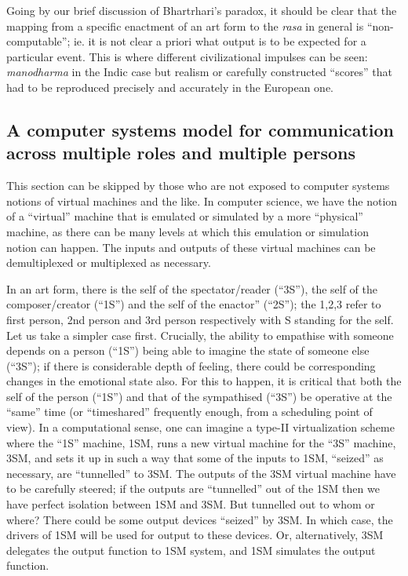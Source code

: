 Going by our brief discussion of Bhartrhari’s paradox, it should be clear that the mapping from a specific enactment of an art form to the \textsl{rasa} in general is “non-computable”; ie. it is not clear a priori what output is to be expected for a particular event. This is where different civilizational impulses can be seen: \textsl{manodharma} in the Indic case but realism or carefully constructed “scores” that had to be reproduced precisely and accurately in the European one. 

\subsection{A computer systems model for communication across multiple roles and multiple persons}\label{chap7-sec4.2}

This section can be skipped by those who are not exposed to computer systems notions of virtual machines and the like. In computer science, we have the notion of a “virtual” machine that is emulated or simulated by a more “physical” machine, as there can be many levels at which this emulation or simulation notion can happen. The inputs and outputs of these virtual machines can be demultiplexed or multiplexed as necessary.

In an art form, there is the self of the spectator/reader (“3S”), the self of the composer/creator (“1S”) and the self of the enactor” (“2S”); the 1,2,3 refer to first person, 2nd person and 3rd person respectively with S standing for the self. Let us take a simpler case first. Crucially, the ability to empathise with someone depends on a person (“1S”) being able to imagine the state of someone else (“3S”); if there is considerable depth of feeling, there could be corresponding changes in the emotional state also. For this to happen, it is critical that both the self of the person (“1S”) and that of the sympathised (“3S”) be operative at the “same” time (or “timeshared” frequently enough, from a scheduling point of view). In a computational sense, one can imagine a type-II virtualization scheme where the “1S” machine, 1SM, runs a new virtual machine for the “3S” machine, 3SM, and sets it up in such a way that some of the inputs to 1SM, “seized” as necessary, are “tunnelled” to 3SM. The outputs of the 3SM virtual machine have to be carefully steered; if the outputs are “tunnelled” out of the 1SM then we have perfect isolation between 1SM and 3SM. But tunnelled out to whom or where? There could be some output devices “seized” by 3SM. In which case, the drivers of 1SM will be used for output to these devices. Or, alternatively, 3SM delegates the output function to 1SM system, and 1SM simulates the output function.


